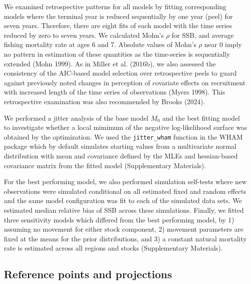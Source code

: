 \documentclass[
]{article}
\begin{document}
We examined retrospective patterns for all models by fitting corresponding models where the terminal year is reduced sequentially by one year (peel) for seven years. Therefore, there are eight fits of each model with the time series reduced by zero to seven years. We calculated Mohn's \(\rho\) for SSB, and average fishing mortality rate at ages 6 and 7. Absolute values of Mohn's \(\rho\) near 0 imply no pattern in estimation of these quantities as the time-series is sequentially extended (Mohn 1999). As in Miller et al. (2016b), we also assessed the consistency of the AIC-based model selection over retrospective peels to guard against previously noted changes in perception of covariate effects on recruitment with increased length of the time series of observations (Myers 1998). This retrospective examination was also recommended by Brooks (2024).

We performed a jitter analysis of the base model \(M_0\) and the best fitting model to investigate whether a local mimimum of the negative log-likelihood surface was obtained by the optimization. We used the \verb|jitter_wham| function in the WHAM package which by default simulates starting values from a multivariate normal distribution with mean and covariance defined by the MLEs and hessian-based covariance matrix from the fitted model (Supplementary Materials).

For the best performing model, we also performed simulation self-tests where new observations were simulated conditional on all estimated fixed and random effects and the same model configuration was fit to each of the simulated data sets. We estimated median relative bias of SSB across these simulations. Finally, we fitted three sensitivity models which differed from the best performing model, by 1) assuming no movement for either stock component, 2) movement parameters are fixed at the means for the prior distributions, and 3) a constant natural mortality rate is estimated across all regions and stocks (Supplementary Materials).

\hypertarget{reference-points-and-projections}{%
\subsection*{Reference points and projections}\label{reference-points-and-projections}}
\end{document}
